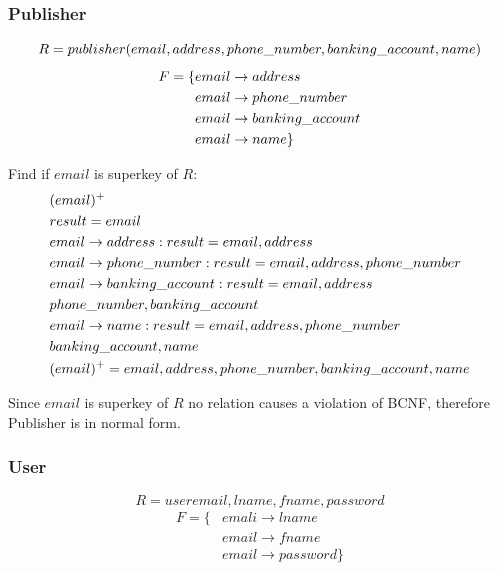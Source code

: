 \documentclass[fleqn]{scrreprt}
\begin{document}
\newpage
\subsubsection{Publisher}
\begin{equation*}
    R = publisher(e\-mail, address, phone\_number, banking\_account, name)
\end{equation*}
\begin{align*}
    F = \{ & e\-mail \rightarrow address\\
           & e\-mail \rightarrow phone\_number\\
           & e\-mail \rightarrow banking\_account\\
           & e\-mail \rightarrow name\}
\end{align*}

Find if $email$ is superkey of $R$:
\begin{align*}
    & (email)^+\\
    & result = email\\
    & e\-mail \rightarrow address : result = email, address\\
    & e\-mail \rightarrow phone\_number : result = email, address, phone\_number\\
    & e\-mail \rightarrow banking\_account : result = email, address\\
    & phone\_number, banking\_account\\
    & e\-mail \rightarrow name : result = email, address, phone\_number\\
    & banking\_account, name\\
    & (email)^+ = email, address, phone\_number, banking\_account, name\\
\end{align*}

Since $email$ is superkey of $R$ no relation causes a violation of BCNF,
therefore Publisher is in normal form.

\subsubsection{User}
\begin{equation*}
    R = user{email, lname, fname, password}
\end{equation*}
\begin{align*}
    F = \{ & emali \rightarrow lname\\
           & email \rightarrow fname\\
           & email \rightarrow password\}
\end{align*}
\end{document}
